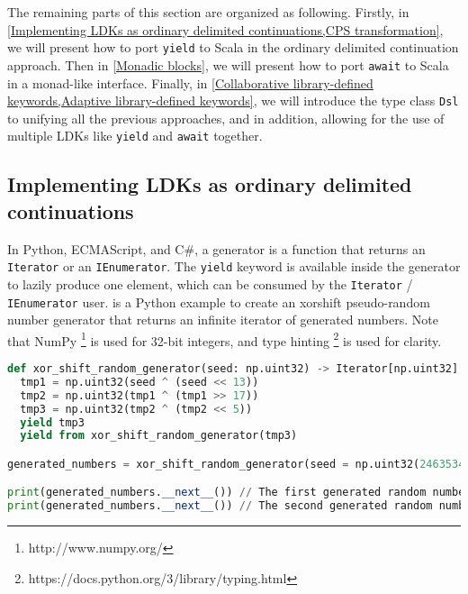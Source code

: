 The remaining parts of this section are organized as following. Firstly, in \cref{Implementing LDKs as ordinary delimited continuations,CPS transformation}, we will present how to port \lstinline{yield} to Scala in the ordinary delimited continuation approach. Then in \cref{Monadic blocks}, we will present how to port \lstinline{await} to Scala in a monad-like interface. Finally, in \cref{Collaborative library-defined keywords,Adaptive library-defined keywords}, we will introduce the type class \lstinline{Dsl} to unifying all the previous approaches, and in addition, allowing for the use of multiple LDKs like \lstinline{yield} and \lstinline{await} together.

\subsection{Implementing LDKs as ordinary delimited continuations}\label{Implementing LDKs as ordinary delimited continuations}

In Python, ECMAScript, and C\#, a generator is a function that returns an \lstinline{Iterator} or an \lstinline{IEnumerator}. The \lstinline{yield} keyword is available inside the generator to lazily produce one element, which can be consumed by the \lstinline{Iterator} / \lstinline{IEnumerator} user.  is a Python example to create an xorshift \cite{marsaglia2003xorshift} pseudo-random number generator that returns an infinite iterator of generated numbers. Note that NumPy \footnote{http://www.numpy.org/} is used for 32-bit integers, and type hinting \footnote{https://docs.python.org/3/library/typing.html} is used for clarity.

\begin{lstlisting}[language=Python,style=Python3,caption={An Xorshift pseudo-random number generator in Python 3.5+},label={xorShiftRandomGenerator-Python}]
def xor_shift_random_generator(seed: np.uint32) -> Iterator[np.uint32]:
  tmp1 = np.uint32(seed ^ (seed << 13))
  tmp2 = np.uint32(tmp1 ^ (tmp1 >> 17))
  tmp3 = np.uint32(tmp2 ^ (tmp2 << 5))
  yield tmp3
  yield from xor_shift_random_generator(tmp3)

generated_numbers = xor_shift_random_generator(seed = np.uint32(2463534242))

print(generated_numbers.__next__()) // The first generated random number
print(generated_numbers.__next__()) // The second generated random number
\end{lstlisting}

